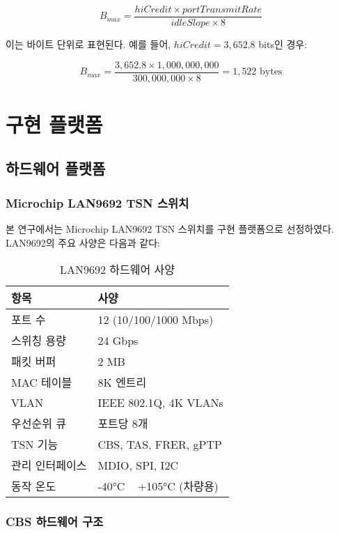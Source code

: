 \documentclass[twocolumn,10pt]{article}
\begin{document}
\begin{equation}
B_{max} = \frac{hiCredit \times portTransmitRate}{idleSlope \times 8}
\end{equation}

이는 바이트 단위로 표현된다. 예를 들어, $hiCredit = 3,652.8$ bits인 경우:

\begin{equation}
B_{max} = \frac{3,652.8 \times 1,000,000,000}{300,000,000 \times 8} = 1,522 \text{ bytes}
\end{equation}

\section{구현 플랫폼}
\label{sec:implementation}

\subsection{하드웨어 플랫폼}

\subsubsection{Microchip LAN9692 TSN 스위치}

본 연구에서는 Microchip LAN9692 TSN 스위치를 구현 플랫폼으로 선정하였다. LAN9692의 주요 사양은 다음과 같다:

\begin{table}[h]
\centering
\caption{LAN9692 하드웨어 사양}
\label{tab:lan9692_specs}
\begin{tabular}{ll}
\toprule
\textbf{항목} & \textbf{사양} \\
\midrule
포트 수 & 12 (10/100/1000 Mbps) \\
스위칭 용량 & 24 Gbps \\
패킷 버퍼 & 2 MB \\
MAC 테이블 & 8K 엔트리 \\
VLAN & IEEE 802.1Q, 4K VLANs \\
우선순위 큐 & 포트당 8개 \\
TSN 기능 & CBS, TAS, FRER, gPTP \\
관리 인터페이스 & MDIO, SPI, I2C \\
동작 온도 & -40°C ~ +105°C (차량용) \\
\bottomrule
\end{tabular}
\end{table}

\subsubsection{CBS 하드웨어 구조}
\end{document}
